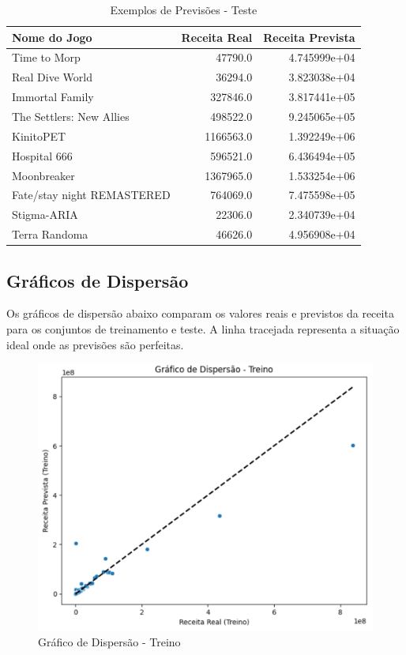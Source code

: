 \documentclass[12pt]{article}
\begin{document}
\begin{table} %
\centering  %
\caption{Exemplos de Previsões - Teste} %
\begin{tabular}{lrr} %
\toprule  %
Nome do Jogo & Receita Real & Receita Prevista \\ %
\midrule  %
              Time to Morp &   47790.0 & 4.745999e+04 \\
           Real Dive World &   36294.0 & 3.823038e+04 \\
           Immortal Family &  327846.0 & 3.817441e+05 \\
  The Settlers: New Allies &  498522.0 & 9.245065e+05 \\
                 KinitoPET & 1166563.0 & 1.392249e+06 \\
              Hospital 666 &  596521.0 & 6.436494e+05 \\
               Moonbreaker & 1367965.0 & 1.533254e+06 \\
Fate/stay night REMASTERED &  764069.0 & 7.475598e+05 \\
               Stigma-ARIA &   22306.0 & 2.340739e+04 \\
             Terra Randoma &   46626.0 & 4.956908e+04 \\
\bottomrule  %
\end{tabular}
\end{table}




\subsection{Gráficos de Dispersão}

Os gráficos de dispersão abaixo comparam os valores reais e previstos da receita para os conjuntos de treinamento e teste.  A linha tracejada representa a situação ideal onde as previsões são perfeitas.


\begin{figure}
    \centering
    \includegraphics[width=0.5\linewidth]{graficoDispersaoTreino}
    \caption{Gráfico de Dispersão - Treino}
    \label{fig:enter-label}
\end{figure}
\end{document}
